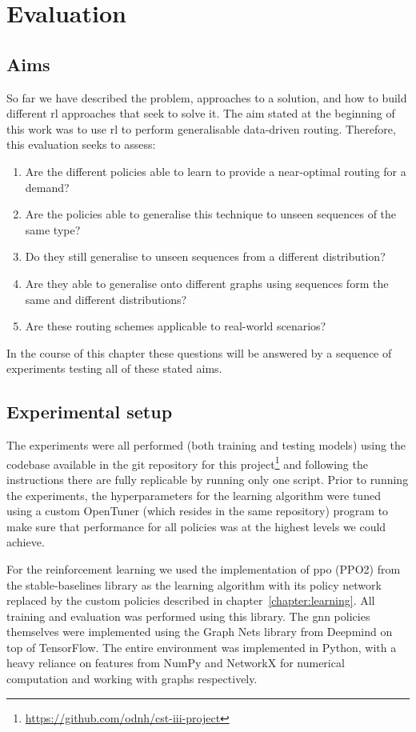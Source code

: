 \chapter{Evaluation}
\label{chapter:evaluation}

\section{Aims}
So far we have described the problem, approaches to a solution, and how to build different \ac{rl} approaches that seek to solve it. The aim stated at the beginning of this work was to use \ac{rl} to perform generalisable data-driven routing. Therefore, this evaluation seeks to assess:

\begin{enumerate}
\item Are the different policies able to learn to provide a near-optimal routing for a demand?
\item Are the policies able to generalise this technique to unseen sequences of the same type?
\item Do they still generalise to unseen sequences from a different distribution?
\item Are they able to generalise onto different graphs using sequences form the same and different distributions?
\item Are these routing schemes applicable to real-world scenarios?
\end{enumerate}

In the course of this chapter these questions will be answered by a sequence of experiments testing all of these stated aims.


\section{Experimental setup}
The experiments were all performed (both training and testing models) using the codebase available in the git repository for this project\footnote{\url{https://github.com/odnh/cst-iii-project}} and following the instructions there are fully replicable by running only one script. Prior to running the experiments, the hyperparameters for the learning algorithm were tuned using a custom OpenTuner\cite{ansel2014opentuner} (which resides in the same repository) program to make sure that performance for all policies was at the highest levels we could achieve.

For the reinforcement learning we used the implementation of \ac{ppo} (PPO2) from the stable-baselines\cite{stable-baselines} library as the learning algorithm with its policy network replaced by the custom policies described in chapter~\ref{chapter:learning}. All training and evaluation was performed using this library. The \ac{gnn} policies themselves were implemented using the Graph Nets\cite{battaglia2018relational} library from Deepmind on top of TensorFlow\cite{tensorflow2015-whitepaper}. The entire environment was implemented in Python\cite{10.5555/1593511}, with a heavy reliance on features from NumPy\cite{oliphant2006guide} and NetworkX\cite{hagberg2008exploring} for numerical computation and working with graphs respectively.

